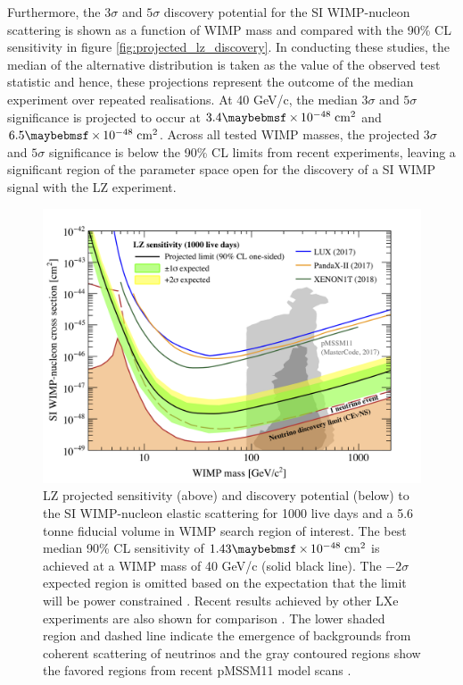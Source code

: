 {Furthermore, the $3\sigma$ and $5\sigma$ discovery potential for the SI WIMP-nucleon scattering is shown as a function of WIMP mass and compared with the 90\% CL sensitivity in figure \ref{fig:projected_lz_discovery}. In conducting these studies, the median of the alternative distribution is taken as the value of the observed test statistic and hence, these projections represent the outcome of the median experiment over repeated realisations. At 40 GeV/c\squared{}, the median $3\sigma$ and $5\sigma$ significance is projected to occur at $3.4 \times 10^{-48} \; \MathText{cm}^2$ and $6.5 \times 10^{-48} \; \MathText{cm}^2$. Across all tested WIMP masses, the projected $3\sigma$ and $5\sigma$ significance is below the 90\% CL limits from recent experiments, leaving a significant region of the parameter space open for the discovery of a SI WIMP signal with the LZ experiment.

%
\begin{figure}[h!]
    \centering
    \includegraphics[scale=0.8]{Chapter_5/Figures/sensitivity_studies/lz_projection_1000_day.png}
    \caption[LZ projected sensitivity to the SI WIMP-nucleon elastic scattering for 1000 live days and a 5.6 tonne fiducial volume in WIMP search region of interest.]%
    {LZ projected sensitivity (above) and discovery potential (below) to the SI WIMP-nucleon elastic scattering for 1000 live days and a 5.6 tonne fiducial volume in WIMP search region of interest. The best median 90\% CL sensitivity of $1.43 \times 10^{-48} \; \MathText{cm}^2$ is achieved at a WIMP mass of 40 GeV/c\squared{} (solid black line). The $-2\sigma$ expected region is omitted based on the expectation that the limit will be power constrained \cite{Cowan:2011an}. Recent results achieved by other LXe experiments are also shown for comparison \cite{lux_full, xenon_1t, pandax_limit}. The lower shaded region and dashed line indicate the emergence of backgrounds from coherent scattering of neutrinos \cite{neutrino_floor} and the gray contoured regions show the favored regions from recent pMSSM11 model scans \cite{pMSSM11}.}
    \label{fig:projected_lz_sensitivity}
\end{figure}
%

}
